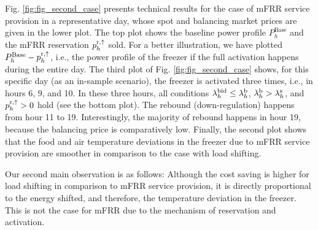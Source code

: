 
Fig. \ref{fig:fig_second_case} presents technical results for the case of mFRR service provision in a representative day, whose spot and balancing market prices are given in the lower plot. The top plot shows the baseline power profile $P^{\text{Base}}_{h}$ and the mFRR reservation $p^{\rm{r}, \uparrow}_{h}$ sold. For a better illustration, we have plotted $P^{\text{Base}}_{h}-p^{\rm{r}, \uparrow}_{h}$, i.e., the power profile of the freezer if the full activation happens during the entire day. The third  plot of Fig. \ref{fig:fig_second_case} shows, for this specific day (as an in-sample scenario), the freezer is activated three times, i.e., in hours 6, 9, and 10. In these three hours, all conditions $\lambda_{h}^{\rm{bid}} \leq \lambda_{h}^{\rm{b}}$, $\lambda_{h}^{\rm{b}} > \lambda_{h}^{\rm{s}}$, and $p^{\rm{r},\uparrow}_{h} > 0$ hold (see the bottom plot). The rebound (down-regulation) happens from hour 11 to 19. Interestingly, the majority of rebound happens in hour 19, because the balancing price is comparatively low. Finally, the second plot shows that the food and air temperature deviations in the freezer due to mFRR service provision are smoother in comparison to the case with load shifting.



Our second main observation is as follows: Although the cost saving is higher for load shifting in comparison to mFRR service provision, it is directly proportional to the energy shifted, and therefore, the temperature deviation in the freezer. This is not the case for mFRR due to the mechanism of reservation and activation.



